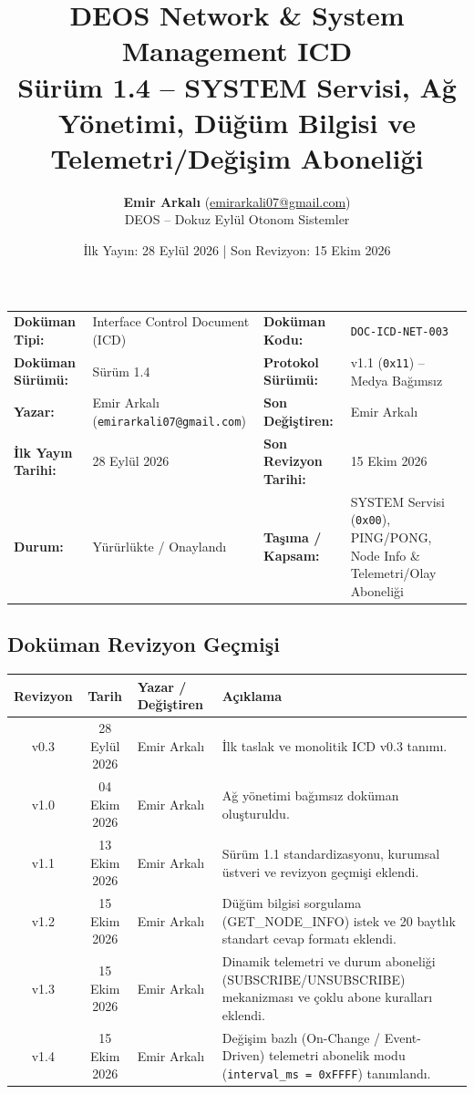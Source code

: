 \documentclass[a4paper,10pt]{article}
\title{\textbf{DEOS Network \& System Management ICD}\\
\large Sürüm 1.4 -- SYSTEM Servisi, Ağ Yönetimi, Düğüm Bilgisi ve Telemetri/Değişim Aboneliği}
\author{\textbf{Emir Arkalı} (\href{mailto:emirarkali07@gmail.com}{emirarkali07@gmail.com})\\DEOS -- Dokuz Eylül Otonom Sistemler}
\date{İlk Yayın: 28 Eylül 2026 \quad | \quad Son Revizyon: 15 Ekim 2026}
\newcommand{\hex}[1]{\texttt{0x#1}}
\newcommand{\code}[1]{\texttt{#1}}
\begin{document}
\maketitle

\begin{center}
\small
\begin{tabularx}{\textwidth}{ll lX}
\toprule
\textbf{Doküman Tipi:} & Interface Control Document (ICD) & \textbf{Doküman Kodu:} & \code{DOC-ICD-NET-003} \\
\textbf{Doküman Sürümü:} & Sürüm 1.4 & \textbf{Protokol Sürümü:} & v1.1 (\hex{11}) -- Medya Bağımsız \\
\textbf{Yazar:} & Emir Arkalı (\texttt{emirarkali07@gmail.com}) & \textbf{Son Değiştiren:} & Emir Arkalı \\
\textbf{İlk Yayın Tarihi:} & 28 Eylül 2026 & \textbf{Son Revizyon Tarihi:} & 15 Ekim 2026 \\
\textbf{Durum:} & Yürürlükte / Onaylandı & \textbf{Taşıma / Kapsam:} & SYSTEM Servisi (\hex{00}), PING/PONG, Node Info \& Telemetri/Olay Aboneliği \\
\bottomrule
\end{tabularx}
\end{center}

\subsection*{Doküman Revizyon Geçmişi}
\begin{center}
\small
\begin{tabularx}{\textwidth}{c c l X}
\toprule
\textbf{Revizyon} & \textbf{Tarih} & \textbf{Yazar / Değiştiren} & \textbf{Açıklama} \\
\midrule
v0.3 & 28 Eylül 2026 & Emir Arkalı & İlk taslak ve monolitik ICD v0.3 tanımı. \\
v1.0 & 04 Ekim 2026 & Emir Arkalı & Ağ yönetimi bağımsız doküman oluşturuldu. \\
v1.1 & 13 Ekim 2026 & Emir Arkalı & Sürüm 1.1 standardizasyonu, kurumsal üstveri ve revizyon geçmişi eklendi. \\
v1.2 & 15 Ekim 2026 & Emir Arkalı & Düğüm bilgisi sorgulama (GET\_NODE\_INFO) istek ve 20 baytlık standart cevap formatı eklendi. \\
v1.3 & 15 Ekim 2026 & Emir Arkalı & Dinamik telemetri ve durum aboneliği (SUBSCRIBE/UNSUBSCRIBE) mekanizması ve çoklu abone kuralları eklendi. \\
v1.4 & 15 Ekim 2026 & Emir Arkalı & Değişim bazlı (On-Change / Event-Driven) telemetri abonelik modu (\code{interval\_ms = 0xFFFF}) tanımlandı. \\
\bottomrule
\end{tabularx}
\end{center}
\vspace{0.8em}
\end{document}
